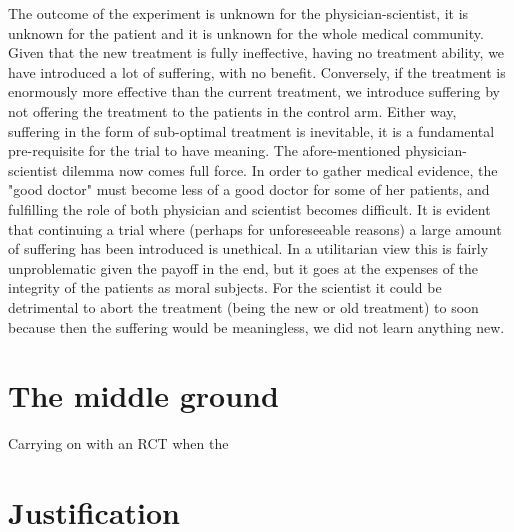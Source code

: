 \documentclass[12p]{article}
\begin{document}
The outcome of the experiment is unknown for the physician-scientist, it is unknown for the patient and it is unknown for the whole medical community.
Given that the new treatment is fully ineffective, having no treatment ability, we have introduced a lot of suffering, with no benefit.
Conversely, if the treatment is enormously more effective than the current treatment, we introduce suffering by not offering the treatment to the patients in the control arm.
Either way, suffering in the form of sub-optimal treatment is inevitable, it is a fundamental pre-requisite for the trial to have meaning.
The afore-mentioned physician-scientist dilemma now comes full force.
In order to gather medical evidence, the "good doctor" must become less of a good doctor for some of her patients, and fulfilling the role of both physician and scientist becomes difficult.
It is evident that continuing a trial where (perhaps for unforeseeable reasons) a large amount of suffering has been introduced is unethical.
In a utilitarian view this is fairly unproblematic given the payoff in the end, but it goes at the expenses of the integrity of the patients as moral subjects.
For the scientist it could be detrimental to abort the treatment (being the new or old treatment) to soon because then the suffering would be meaningless, we did not learn anything new.



\section{The middle ground}

Carrying on with an RCT when the 

\section{Justification}
\end{document}

